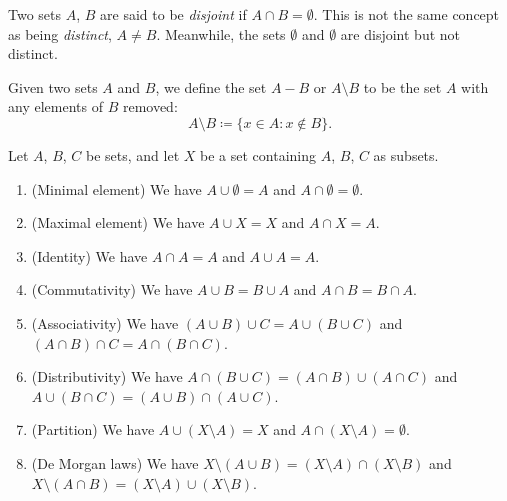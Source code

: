 \begin{note}
Two sets \(A\), \(B\) are said to be \emph{disjoint} if \(A \cap B = \emptyset\).
This is not the same concept as being \emph{distinct}, \(A \neq B\).
Meanwhile, the sets \(\emptyset\) and \(\emptyset\) are disjoint but not distinct.
\end{note}

\setcounter{theorem}{26}
\begin{definition}\label{3.1.27}
Given two sets \(A\) and \(B\), we define the set \(A - B\) or \(A \setminus B\) to be the set \(A\) with any elements of \(B\) removed:
\[
    A \setminus B \coloneqq \{x \in A : x \notin B\}.
\]
\end{definition}

\begin{proposition}\label{3.1.28}
Let \(A\), \(B\), \(C\) be sets, and let \(X\) be a set containing \(A\), \(B\), \(C\) as subsets.
    \begin{enumerate}
        \item (Minimal element) We have \(A \cup \emptyset = A\) and \(A \cap \emptyset = \emptyset\).
        \item (Maximal element) We have \(A \cup X = X\) and \(A \cap X = A\).
        \item (Identity) We have \(A \cap A = A\) and \(A \cup A = A\).
        \item (Commutativity) We have \(A \cup B = B \cup A\) and \(A \cap B = B \cap A\).
        \item (Associativity) We have \((A \cup B) \cup C = A \cup (B \cup C)\) and \((A \cap B) \cap C = A \cap (B \cap C)\).
        \item (Distributivity) We have \(A \cap (B \cup C) = (A \cap B) \cup (A \cap C)\) and \(A \cup (B \cap C) = (A \cup B) \cap (A \cup C)\).
        \item (Partition) We have \(A \cup (X \setminus A) = X\) and \(A \cap (X \setminus A) = \emptyset\).
        \item (De Morgan laws) We have \(X \setminus (A \cup B) = (X \setminus A) \cap (X \setminus B)\) and \(X \setminus (A \cap B) = (X \setminus A) \cup (X \setminus B)\).
    \end{enumerate}
\end{proposition}

